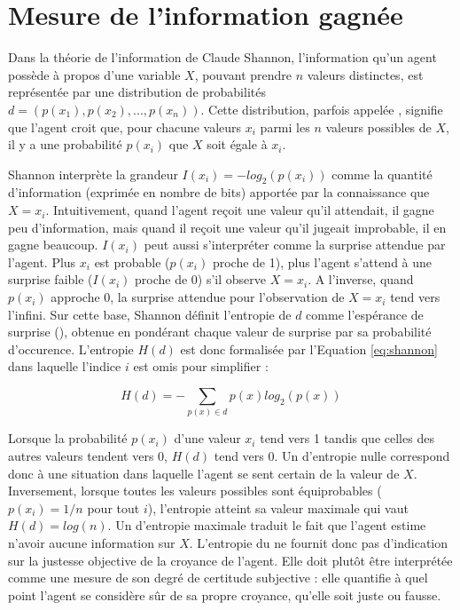 \section{Mesure de l'information gagnée}

\noindent
Dans la théorie de l'information de Claude Shannon, l'information qu'un agent possède à propos d'une variable $X$, pouvant prendre $n$ valeurs distinctes, est représentée par une distribution de probabilités $d= (p(x_1), p(x_2), ... , \allowbreak p(x_n))$.
Cette distribution, parfois appelée , signifie que l'agent \og croit \fg que, pour chacune valeurs $x_i$ parmi les $n$ valeurs possibles de $X$, il y a une probabilité $p(x_i)$ que $X$ soit égale à $x_i$. 

Shannon interprète la grandeur $I(x_i) = -log_2(p(x_i))$ comme la quantité d'information (exprimée en nombre de bits) apportée par la connaissance que $X = x_i$. 
Intuitivement, quand l'agent reçoit une valeur qu'il attendait, il gagne peu d'information, mais quand il reçoit une valeur qu'il jugeait improbable, il en gagne beaucoup.
$I(x_i)$ peut aussi s'interpréter comme la \og surprise attendue \fg  par l'agent. 
Plus $x_i$ est probable ($p(x_i)$ proche de 1), plus l'agent s'attend à une surprise faible ($I(x_i)$ proche de 0) s'il observe $X = x_i$. 
A l'inverse, quand $p(x_i)$ approche 0, la surprise attendue pour l'observation de $X=x_i$ tend vers l'infini. 
Sur cette base, Shannon définit l'entropie de $d$ comme l'espérance de surprise (), obtenue en pondérant chaque valeur de surprise par sa probabilité d'occurence.
L'entropie $H(d)$ est donc formalisée par l'Equation \eqref{eq:shannon} dans laquelle l'indice $i$ est omis pour simplifier :

\begin{equation}\label{eq:shannon}
	H(d) = - \sum_{p(x) \in d} p(x) log_2(p(x))
\end{equation}

Lorsque la probabilité $p(x_i)$ d'une valeur $x_i$ tend vers 1 tandis que celles des autres valeurs tendent vers 0, $H(d)$ tend vers 0.
Un  d'entropie nulle correspond donc à une situation dans laquelle l'agent \og se sent certain \fg de la valeur de $X$. 
Inversement, lorsque toutes les valeurs possibles sont équiprobables ($p(x_i) = 1/n$ pour tout $i$), l'entropie atteint sa valeur maximale qui vaut $H(d) = log(n)$. 
Un  d'entropie maximale traduit le fait que l'agent estime n'avoir aucune information sur $X$.
L'entropie du  ne fournit donc pas d'indication sur la justesse objective de la croyance de l'agent.
Elle doit plutôt être interprétée comme une mesure de son degré de certitude subjective : elle quantifie à quel point l’agent se considère sûr de sa propre croyance, qu’elle soit juste ou fausse.

